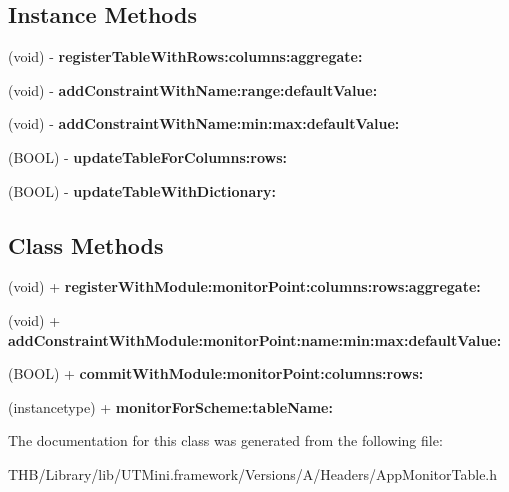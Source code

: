 \subsection*{Instance Methods}
\begin{DoxyCompactItemize}
\item 
\mbox{\label{interface_app_monitor_table_ac1c33d7133b99680ce940e88f93f42ac}} 
(void) -\/ {\bfseries register\+Table\+With\+Rows\+:columns\+:aggregate\+:}
\item 
\mbox{\label{interface_app_monitor_table_a70ba4c6a10274a51205bd68680c96d8d}} 
(void) -\/ {\bfseries add\+Constraint\+With\+Name\+:range\+:default\+Value\+:}
\item 
\mbox{\label{interface_app_monitor_table_a59f6d04ac1705abc69d292a8fd4c2166}} 
(void) -\/ {\bfseries add\+Constraint\+With\+Name\+:min\+:max\+:default\+Value\+:}
\item 
\mbox{\label{interface_app_monitor_table_abdbca46ba81cc9f1f83e98fada2c96fe}} 
(B\+O\+OL) -\/ {\bfseries update\+Table\+For\+Columns\+:rows\+:}
\item 
\mbox{\label{interface_app_monitor_table_a073819f018a02f2358e1d1f7c53684e2}} 
(B\+O\+OL) -\/ {\bfseries update\+Table\+With\+Dictionary\+:}
\end{DoxyCompactItemize}
\subsection*{Class Methods}
\begin{DoxyCompactItemize}
\item 
\mbox{\label{interface_app_monitor_table_a14d0a0681a76ca07ef850c3d80c47c22}} 
(void) + {\bfseries register\+With\+Module\+:monitor\+Point\+:columns\+:rows\+:aggregate\+:}
\item 
\mbox{\label{interface_app_monitor_table_aa5b649842423ac9d774962c558d021c8}} 
(void) + {\bfseries add\+Constraint\+With\+Module\+:monitor\+Point\+:name\+:min\+:max\+:default\+Value\+:}
\item 
\mbox{\label{interface_app_monitor_table_a0e669dc099d28bee4030fa44b320d7bb}} 
(B\+O\+OL) + {\bfseries commit\+With\+Module\+:monitor\+Point\+:columns\+:rows\+:}
\item 
\mbox{\label{interface_app_monitor_table_a2602cf1b866b1dcd11df143c404b20b0}} 
(instancetype) + {\bfseries monitor\+For\+Scheme\+:table\+Name\+:}
\end{DoxyCompactItemize}


The documentation for this class was generated from the following file\+:\begin{DoxyCompactItemize}
\item 
T\+H\+B/\+Library/lib/\+U\+T\+Mini.\+framework/\+Versions/\+A/\+Headers/App\+Monitor\+Table.\+h\end{DoxyCompactItemize}
